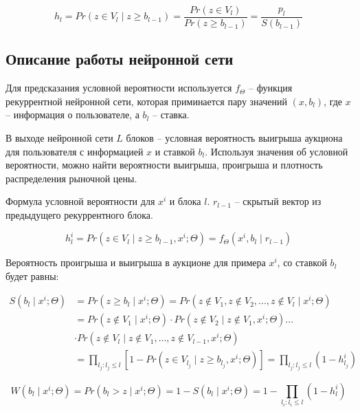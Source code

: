 \documentclass[times,specification,annotation]{itmo-student-thesis}
\begin{document}
\begin{equation}
    h_l = Pr(z \in V_l \mid z \geq b_{l - 1}) = \frac{Pr(z \in V_l)}{Pr(z \geq b_{l - 1})} = \frac{p_l}{S(b_{l - 1})}
\end{equation}

\subsection{Описание работы нейронной сети}

Для предсказания условной вероятности используется 
$f_{\Theta}$ – функция рекуррентной нейронной сети, 
которая приминается пару значений $(x, b_l)$, 
где $x$ – информация о пользователе, а $b_l$ – ставка.

В выходе нейронной сети $L$ блоков – условная вероятность выигрыша аукциона для пользователя с информацией $x$ и ставкой $b_l$. 
Используя значения об условной вероятности, можно найти вероятности выигрыша, проигрыша и плотность распределения рыночной цены.

Формула условной вероятности для $x^i$ и блока $l$. $r_{l-1}$ – скрытый вектор из предыдущего рекуррентного блока.

\begin{equation}
    h_l^i = Pr⁡(z \in V_l \mid z \geq b_{l-1}, x^i; \Theta)= f_{\Theta} (x^i, b_l \mid r_{l-1})
\end{equation}

Вероятность проигрыша и выигрыша в аукционе для примера $x^i$, со ставкой $b_l$ будет равны:

\begin{equation}\label{eq:nnS}
    \begin{split}
        S(b_l \mid x^i; \Theta) & = Pr(z \geq b_l \mid x^i; \Theta) = Pr(z \notin V_1, z \notin V_2, ..., z \notin V_l \mid x^i; \Theta) \\
        & = Pr(z \notin V_1 \mid x^i; \Theta) \cdot Pr(z \notin V_2 \mid z \notin V_1, x^i; \Theta) ... \\
        & \cdot Pr(z \notin V_l \mid z \notin V_1, ..., z \notin V_{l - 1},  x^i; \Theta) \\
        & = \prod_{l_j : l_j \leq l} \left[1 - Pr(z \in V_{l_j} \mid z \geq b_{l_j}, x^i; \Theta)\right] = \prod_{l_j: l_j \leq l} (1 - h_{l_j}^i)
    \end{split}
\end{equation}

\begin{equation}\label{eq:nnW}
    W(b_l \mid x^i; \Theta) = Pr(b_l > z \mid x^i; \Theta) = 1 - S(b_l \mid x^i; \Theta) = 1 - \prod_{l_i: l_i \leq l} (1 - h_l^i)
\end{equation}
\end{document}
